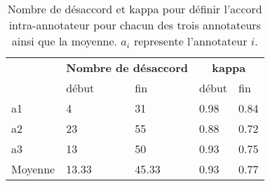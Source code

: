 \begin{table}[th]
  \centering
  \begin{tabular}{|p{2cm}| l l | l l|}
    \hline
        &\multicolumn{2}{c}{\textbf{Nombre de désaccord}} & \multicolumn{2}{c}{\textbf{kappa}} \\
              &début  &fin    &début      &fin  \\
    \hline
    a1        &4      &31     &0.98       &0.84	\\
    a2        &23     &55     &0.88       &0.72 \\
    a3        &13     &50     &0.93       &0.75	\\
    \hline
    Moyenne  &13.33 &45.33 &0.93   &0.77 \\
    \hline
  \end{tabular}
\caption{Nombre de désaccord et kappa pour définir l'accord intra-annotateur pour chacun des trois annotateurs ainsi que la moyenne. $a_i$ represente l'annotateur $i$.}
\label{tab:accordIntraAnnot}
\end{table}
